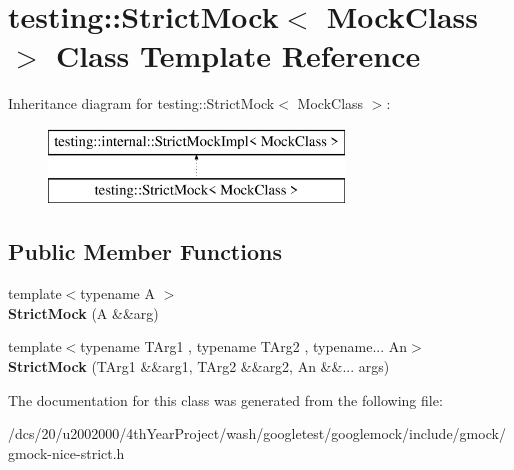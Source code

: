 \hypertarget{classtesting_1_1StrictMock}{}\section{testing\+:\+:Strict\+Mock$<$ Mock\+Class $>$ Class Template Reference}
\label{classtesting_1_1StrictMock}
Inheritance diagram for testing\+:\+:Strict\+Mock$<$ Mock\+Class $>$\+:\begin{figure}[H]
\begin{center}
\leavevmode
\includegraphics[height=2.000000cm]{classtesting_1_1StrictMock}
\end{center}
\end{figure}
\subsection*{Public Member Functions}
\begin{DoxyCompactItemize}
\item 
\mbox{\label{classtesting_1_1StrictMock_a868b6082e86b1961328f06421aab455f}} 
{\footnotesize template$<$typename A $>$ }\\{\bfseries Strict\+Mock} (A \&\&arg)
\item 
\mbox{\label{classtesting_1_1StrictMock_abc2e558afee2ba03aa4319aa3850a3a5}} 
{\footnotesize template$<$typename T\+Arg1 , typename T\+Arg2 , typename... An$>$ }\\{\bfseries Strict\+Mock} (T\+Arg1 \&\&arg1, T\+Arg2 \&\&arg2, An \&\&... args)
\end{DoxyCompactItemize}


The documentation for this class was generated from the following file\+:\begin{DoxyCompactItemize}
\item 
/dcs/20/u2002000/4th\+Year\+Project/wash/googletest/googlemock/include/gmock/gmock-\/nice-\/strict.\+h\end{DoxyCompactItemize}

